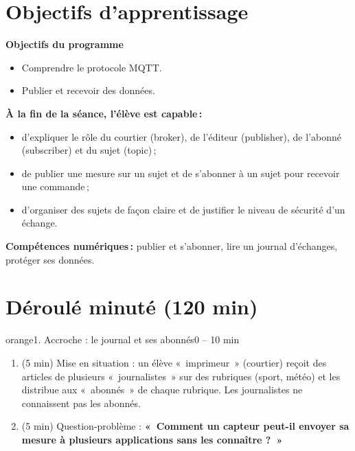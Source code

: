 \documentclass[11pt,a4paper]{article}
\begin{document}
\section{Objectifs d'apprentissage}
\begin{tcolorbox}[colback=gray!8,colframe=gray!60!black,arc=1mm,boxrule=0.5pt]
\textbf{Objectifs du programme}
\begin{itemize}
 \item Comprendre le protocole MQTT.
 \item Publier et recevoir des données.
\end{itemize}
\textbf{À la fin de la séance, l'élève est capable\,:}
\begin{itemize}
 \item d'expliquer le rôle du courtier (broker), de l'éditeur (publisher), de l'abonné (subscriber) et du sujet (topic)\,;
 \item de publier une mesure sur un sujet et de s'abonner à un sujet pour recevoir une commande\,;
 \item d'organiser des sujets de façon claire et de justifier le niveau de sécurité d'un échange.
\end{itemize}
\textbf{Compétences numériques\,:} publier et s'abonner, lire un journal d'échanges, protéger ses données.
\end{tcolorbox}

\section{Déroulé minuté (120 min)}

\begin{etape}{orange}{1. Accroche : le journal et ses abonnés}{0 -- 10 min}
\begin{enumerate}
 \item (5 min) Mise en situation : un élève «~imprimeur~» (courtier) reçoit des articles de plusieurs «~journalistes~» sur des rubriques (sport, météo) et les distribue aux «~abonnés~» de chaque rubrique. Les journalistes ne connaissent pas les abonnés.
 \item (5 min) Question-problème : \textbf{«~Comment un capteur peut-il envoyer sa mesure à plusieurs applications sans les connaître ?~»}
\end{enumerate}
\end{etape}
\end{document}
